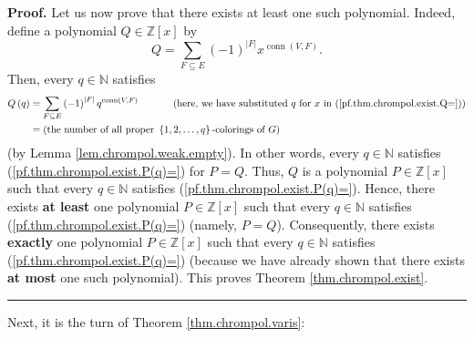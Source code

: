 \documentclass[numbers=enddot,12pt,final,onecolumn,notitlepage]{scrartcl}%
\theoremstyle{definition}
\newenvironment{proof}[1][Proof]{\noindent\textbf{#1.} }{\ \rule{0.5em}{0.5em}}
\newenvironment{verlong}{}{}
\let\sumnonlimits\sum
\renewcommand{\sum}{\sumnonlimits\limits}
\begin{document}
\begin{verlong}
\begin{proof}
Let us now prove that there exists at least one such polynomial. Indeed,
define a polynomial $Q\in\mathbb{Z}\left[  x\right]  $ by%
\begin{equation}
Q=\sum_{F\subseteq E}\left(  -1\right)  ^{\left\vert F\right\vert
}x^{\operatorname*{conn}\left(  V,F\right)  }.
\label{pf.thm.chrompol.exist.Q=}%
\end{equation}
Then, every $q\in\mathbb{N}$ satisfies%
\begin{align*}
Q\left(  q\right)   &  =\sum_{F\subseteq E}\left(  -1\right)  ^{\left\vert
F\right\vert }q^{\operatorname*{conn}\left(  V,F\right)  }%
\ \ \ \ \ \ \ \ \ \ \left(  \text{here, we have substituted }q\text{ for
}x\text{ in (\ref{pf.thm.chrompol.exist.Q=})}\right) \\
&  =\left(  \text{the number of all proper }\left\{  1,2,\ldots,q\right\}
\text{-colorings of }G\right)
\end{align*}
(by Lemma \ref{lem.chrompol.weak.empty}). In other words, every $q\in
\mathbb{N}$ satisfies (\ref{pf.thm.chrompol.exist.P(q)=}) for $P=Q$. Thus, $Q$
is a polynomial $P\in\mathbb{Z}\left[  x\right]  $ such that every
$q\in\mathbb{N}$ satisfies (\ref{pf.thm.chrompol.exist.P(q)=}). Hence, there
exists \textbf{at least} one polynomial $P\in\mathbb{Z}\left[  x\right]  $
such that every $q\in\mathbb{N}$ satisfies (\ref{pf.thm.chrompol.exist.P(q)=})
(namely, $P=Q$). Consequently, there exists \textbf{exactly} one polynomial
$P\in\mathbb{Z}\left[  x\right]  $ such that every $q\in\mathbb{N}$ satisfies
(\ref{pf.thm.chrompol.exist.P(q)=}) (because we have already shown that there
exists \textbf{at most} one such polynomial). This proves Theorem
\ref{thm.chrompol.exist}.
\end{proof}
\end{verlong}

Next, it is the turn of Theorem \ref{thm.chrompol.varis}:
\end{document}
